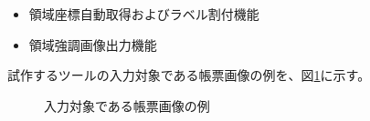 \begin{itemize}
    \item 領域座標自動取得およびラベル割付機能
    \item 領域強調画像出力機能
\end{itemize}

試作するツールの入力対象である帳票画像の例を、図\ref{fig:original}に示す。
\begin{figure}[tp]
    \begin{center}
        \caption{入力対象である帳票画像の例}
        \label{fig:original}
    \end{center}
\end{figure}

